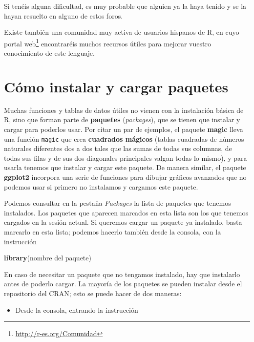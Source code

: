 \documentclass[
]{book}
\newenvironment{Shaded}{\begin{snugshade}}{\end{snugshade}}
\newcommand{\KeywordTok}[1]{\textcolor[rgb]{0.13,0.29,0.53}{\textbf{#1}}}
\newcommand{\NormalTok}[1]{#1}
\DeclareRobustCommand{\href}[2]{#2\footnote{\url{#1}}}
\providecommand{\tightlist}{%
  \setlength{\itemsep}{0pt}\setlength{\parskip}{0pt}}
\theoremstyle{definition}
\theoremstyle{definition}
\theoremstyle{definition}
\theoremstyle{remark}
\begin{document}
Si tenéis alguna dificultad, es muy probable que alguien ya la haya tenido y se la hayan resuelto en alguno de estos foros.

Existe también una comunidad muy activa de usuarios hispanos de R, en cuyo \href{http://r-es.org/Comunidad}{portal web} encontraréis muchos recursos útiles para mejorar vuestro conocimiento de este lenguaje.

\hypertarget{sec:paquetes}{%
\section{Cómo instalar y cargar paquetes}\label{sec:paquetes}}

Muchas funciones y tablas de datos útiles no vienen con la instalación básica de R, sino que forman parte de \textbf{paquetes} (\emph{packages}), que se tienen que instalar y cargar para poderlos usar. Por citar un par de ejemplos, el paquete \textbf{magic} lleva una función \texttt{magic} que crea \textbf{cuadrados mágicos} (tablas cuadradas de números naturales diferentes dos a dos tales que las sumas de todas sus columnas, de todas sus filas y de sus dos diagonales principales valgan todas lo mismo), y para usarla tenemos que instalar y cargar este paquete. De manera similar, el paquete \textbf{ggplot2} incorpora una serie de funciones para dibujar gráficos avanzados que no podemos usar si primero no instalamos y cargamos este paquete.

Podemos consultar en la pestaña \emph{Packages} la lista de paquetes que tenemos instalados. Los paquetes que aparecen marcados en esta lista son los que tenemos cargados en la sesión actual. Si queremos cargar un paquete ya instalado, basta marcarlo en esta lista; podemos hacerlo también desde la consola, con la instrucción

\begin{Shaded}
\begin{Highlighting}[]
\KeywordTok{library}\NormalTok{(nombre del paquete)}
\end{Highlighting}
\end{Shaded}

En caso de necesitar un paquete que no tengamos instalado, hay que instalarlo antes de poderlo cargar. La mayoría de los paquetes se pueden instalar desde el repositorio del CRAN; esto se puede hacer de dos maneras:

\begin{itemize}
\tightlist
\item
  Desde la consola, entrando la instrucción
\end{itemize}
\end{document}
